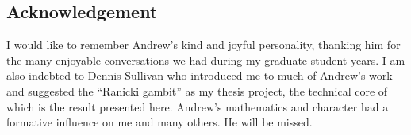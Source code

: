 
\subsection*{Acknowledgement}

I would like to remember Andrew's kind and joyful personality, thanking him for the many enjoyable conversations we had during my graduate student years.
I am also indebted to Dennis Sullivan who introduced me to much of Andrew's work and suggested the ``Ranicki gambit'' as my thesis project, the technical core of which is the result presented here.
Andrew's mathematics and character had a formative influence on me and many others.
He will be missed.